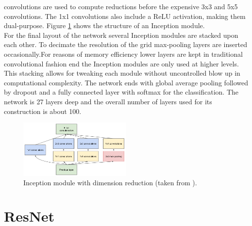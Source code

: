 \documentclass[11pt]{report}
\begin{document}
convolutions are used to compute reductions before the expensive 3x3 and 5x5
convolutions. The 1x1 convolutions also include a ReLU activation, making them
dual-purpose. Figure \ref{InceptionModule} shows the structure of an Inception
module. \\
For the final layout of the network several Inception modules are stacked
upon each other. To decimate the resolution of the grid max-pooling layers are
inserted occasionally.For reasons of memory efficiency lower layers are kept in
traditional convolutional fashion end the Inception modules are only used at
higher levels. This stacking allows for tweaking each module without
uncontrolled blow up in computational complexity. The network ends with global
average pooling followed by dropout and a fully connected layer with softmax for the
classification. The network is 27 layers deep and the overall number of layers
used for its construction is about 100.
\begin{figure}
  \centering
  \includegraphics[width=0.5\textwidth]{InceptionModule}
  \caption{Inception module with dimension reduction (taken from \cite{szegedy2015going}).}
  \label{InceptionModule}
\end{figure}

\section{ResNet}
\end{document}
